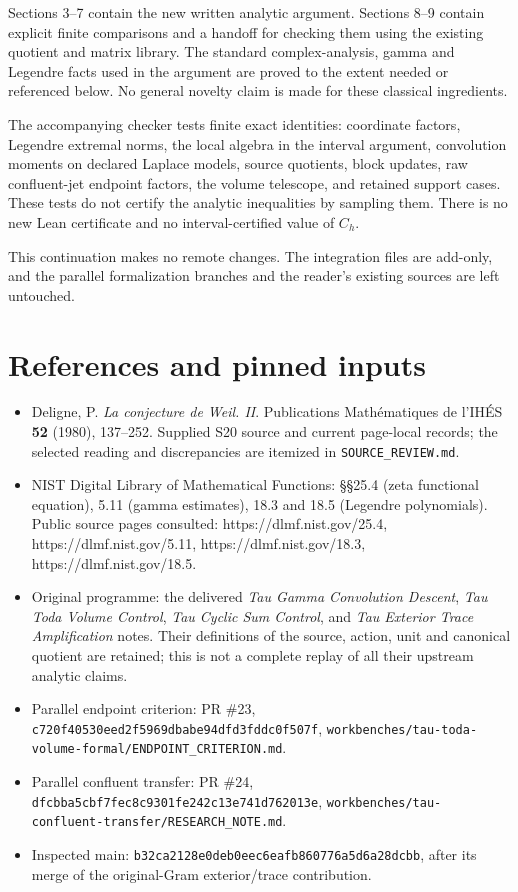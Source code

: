 Sections 3--7 contain the new written analytic argument. Sections 8--9
contain explicit finite comparisons and a handoff for checking them
using the existing quotient and matrix library. The standard
complex-analysis, gamma and Legendre facts used in the argument are
proved to the extent needed or referenced below. No general novelty
claim is made for these classical ingredients.

The accompanying checker tests finite exact identities: coordinate
factors, Legendre extremal norms, the local algebra in the interval
argument, convolution moments on declared Laplace models, source
quotients, block updates, raw confluent-jet endpoint factors, the volume
telescope, and retained support cases. These tests do not certify the
analytic inequalities by sampling them. There is no new Lean certificate
and no interval-certified value of \(C_h\).

This continuation makes no remote changes. The integration files are
add-only, and the parallel formalization branches and the reader's
existing sources are left untouched.

\section{References and pinned
inputs}\label{GraphV2:references-and-pinned-inputs}

\begin{itemize}
\tightlist
\item
  Deligne, P. \emph{La conjecture de Weil. II}. Publications
  Mathématiques de l'IHÉS \textbf{52} (1980), 137--252. Supplied S20
  source and current page-local records; the selected reading and
  discrepancies are itemized in \texttt{SOURCE\_REVIEW.md}.
\item
  NIST Digital Library of Mathematical Functions: §§25.4 (zeta
  functional equation), 5.11 (gamma estimates), 18.3 and 18.5 (Legendre
  polynomials). Public source pages consulted:
  https://dlmf.nist.gov/25.4, https://dlmf.nist.gov/5.11,
  https://dlmf.nist.gov/18.3, https://dlmf.nist.gov/18.5.
\item
  Original programme: the delivered \emph{Tau Gamma Convolution
  Descent}, \emph{Tau Toda Volume Control}, \emph{Tau Cyclic Sum
  Control}, and \emph{Tau Exterior Trace Amplification} notes. Their
  definitions of the source, action, unit and canonical quotient are
  retained; this is not a complete replay of all their upstream analytic
  claims.
\item
  Parallel endpoint criterion: PR \#23,
  \nolinkurl{c720f40530eed2f5969dbabe94dfd3fddc0f507f},
  \texttt{workbenches/tau-toda-volume-formal/ENDPOINT\_CRITERION.md}.
\item
  Parallel confluent transfer: PR \#24,
  \nolinkurl{dfcbba5cbf7fec8c9301fe242c13e741d762013e},
  \texttt{workbenches/tau-confluent-transfer/RESEARCH\_NOTE.md}.
\item
  Inspected main: \nolinkurl{b32ca2128e0deb0eec6eafb860776a5d6a28dcbb},
  after its merge of the original-Gram exterior/trace contribution.
\end{itemize}

